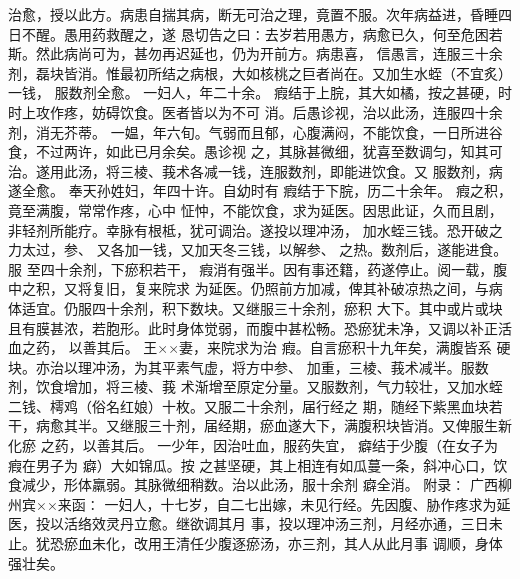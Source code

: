 \documentclass[a4paper,12pt,UTF8,twoside]{ctexbook}
\begin{document}
治愈，授以此方。病患自揣其病，断无可治之理，竟置不服。次年病益进，昏睡四日不醒。愚用药救醒之，遂 
恳切告之曰∶去岁若用愚方，病愈已久，何至危困若斯。然此病尚可为，甚勿再迟延也，仍为开前方。病患喜， 
信愚言，连服三十余剂，磊块皆消。惟最初所结之病根，大如核桃之巨者尚在。又加生水蛭（不宜炙）一钱， 
服数剂全愈。 
一妇人，年二十余。 瘕结于上脘，其大如橘，按之甚硬，时时上攻作疼，妨碍饮食。医者皆以为不可 
消。后愚诊视，治以此汤，连服四十余剂，消无芥蒂。 
一媪，年六旬。气弱而且郁，心腹满闷，不能饮食，一日所进谷食，不过两许，如此已月余矣。愚诊视 
之，其脉甚微细，犹喜至数调匀，知其可治。遂用此汤，将三棱、莪术各减一钱，连服数剂，即能进饮食。又 
服数剂，病遂全愈。 
奉天孙姓妇，年四十许。自幼时有 瘕结于下脘，历二十余年。 瘕之积，竟至满腹，常常作疼，心中 
怔忡，不能饮食，求为延医。因思此证，久而且剧，非轻剂所能疗。幸脉有根柢，犹可调治。遂投以理冲汤， 
加水蛭三钱。恐开破之力太过，参、 又各加一钱，又加天冬三钱，以解参、 之热。数剂后，遂能进食。服 
至四十余剂，下瘀积若干， 瘕消有强半。因有事还籍，药遂停止。阅一载，腹中之积，又将复旧，复来院求 
为延医。仍照前方加减，俾其补破凉热之间，与病体适宜。仍服四十余剂，积下数块。又继服三十余剂，瘀积 
大下。其中或片或块且有膜甚浓，若胞形。此时身体觉弱，而腹中甚松畅。恐瘀犹未净，又调以补正活血之药， 
以善其后。 
王××妻，来院求为治 瘕。自言瘀积十九年矣，满腹皆系 
硬块。亦治以理冲汤，为其平素气虚，将方中参、 加重，三棱、莪术减半。服数剂，饮食增加，将三棱、莪 
术渐增至原定分量。又服数剂，气力较壮，又加水蛭二钱、樗鸡（俗名红娘）十枚。又服二十余剂，届行经之 
期，随经下紫黑血块若干，病愈其半。又继服三十剂，届经期，瘀血遂大下，满腹积块皆消。又俾服生新化瘀 
之药，以善其后。 
一少年，因治吐血，服药失宜， 癖结于少腹（在女子为 瘕在男子为 癖）大如锦瓜。按 
之甚坚硬，其上相连有如瓜蔓一条，斜冲心口，饮食减少，形体羸弱。其脉微细稍数。治以此汤，服十余剂 
癖全消。 
附录∶ 
广西柳州宾××来函∶ 
一妇人，十七岁，自二七出嫁，未见行经。先因腹、胁作疼求为延医，投以活络效灵丹立愈。继欲调其月 
事，投以理冲汤三剂，月经亦通，三日未止。犹恐瘀血未化，改用王清任少腹逐瘀汤，亦三剂，其人从此月事 
调顺，身体强壮矣。 
\end{document}
